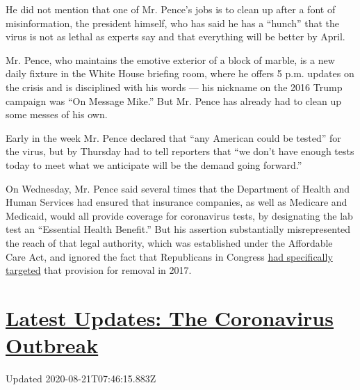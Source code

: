 He did not mention that one of Mr. Pence's jobs is to clean up after a
font of misinformation, the president himself, who has said he has a
``hunch'' that the virus is not as lethal as experts say and that
everything will be better by April.

Mr. Pence, who maintains the emotive exterior of a block of marble, is a
new daily fixture in the White House briefing room, where he offers 5
p.m. updates on the crisis and is disciplined with his words --- his
nickname on the 2016 Trump campaign was ``On Message Mike.'' But Mr.
Pence has already had to clean up some messes of his own.

Early in the week Mr. Pence declared that ``any American could be
tested'' for the virus, but by Thursday had to tell reporters that ``we
don't have enough tests today to meet what we anticipate will be the
demand going forward.''

On Wednesday, Mr. Pence said several times that the Department of Health
and Human Services had ensured that insurance companies, as well as
Medicare and Medicaid, would all provide coverage for coronavirus tests,
by designating the lab test an ``Essential Health Benefit.'' But his
assertion substantially misrepresented the reach of that legal
authority, which was established under the Affordable Care Act, and
ignored the fact that Republicans in Congress
\href{https://www.nytimes3xbfgragh.onion/2017/03/23/upshot/late-gop-proposal-could-mean-plans-that-cover-aromatherapy-but-not-chemotherapy.html}{had
specifically targeted} that provision for removal in 2017.

\hypertarget{latest-updates-the-coronavirus-outbreak}{%
\section{\texorpdfstring{\href{https://www.nytimes3xbfgragh.onion/2020/08/20/world/coronavirus-covid.html?action=click\&pgtype=Article\&state=default\&region=MAIN_CONTENT_1\&context=storylines_live_updates}{Latest
Updates: The Coronavirus
Outbreak}}{Latest Updates: The Coronavirus Outbreak}}\label{latest-updates-the-coronavirus-outbreak}}

Updated 2020-08-21T07:46:15.883Z

